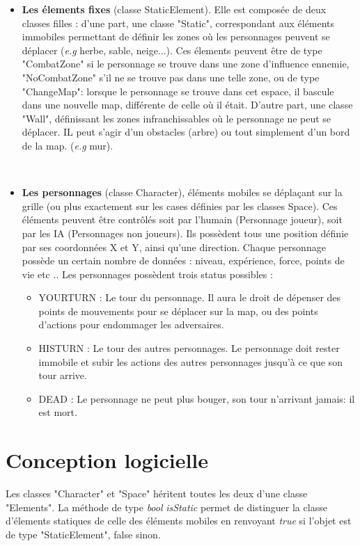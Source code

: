 \documentclass[12pt,a4paper]{report}
\begin{document}
\begin{itemize}
    

    \item  \textbf{Les élements fixes} (classe StaticElement). Elle est composée de deux classes filles : d'une part, une classe "Static", correspondant aux éléments immobiles permettant de définir les zones où les personnages peuvent se déplacer (\textit{e.g} herbe, sable, neige...). Ces élements peuvent être de type "CombatZone" si le personnage se trouve dans une zone d'influence ennemie, "NoCombatZone" s'il ne se trouve pas dans une telle zone, ou de type "ChangeMap": lorsque le personnage se trouve dans cet espace, il bascule dans une nouvelle map, différente de celle où il était.
   D'autre part, une classe "Wall", définissant les zones infranchissables où le personnage ne peut se déplacer. IL peut s'agir d'un obstacles (arbre) ou tout simplement d'un bord de la map. (\textit{e.g}  mur).
    
         
\par\leavevmode\
    \item \textbf{Les personnages} (classe Character), éléments mobiles se déplaçant sur la grille (ou plus exactement sur les cases définies par les classes Space). Ces éléments peuvent être contrôlés soit par l'humain (Personnage joueur), soit par les IA (Personnages non joueurs). Ils possèdent tous une position définie par ses coordonnées X et Y, ainsi qu'une direction. Chaque personnage possède un certain nombre de données : niveau, expérience, force, points de vie etc .. Les personnages possèdent trois status possibles :
    \begin{itemize}
    
    \item YOURTURN : Le tour du personnage. Il aura le droit de dépenser des points de mouvements pour se déplacer sur la map, ou des points d'actions pour endommager les adversaires.
    \item HISTURN : Le tour des autres personnages. Le personnage doit rester immobile et subir les actions des autres personnages jusqu'à ce que son tour arrive.
    \item  DEAD : Le personnage ne peut plus bouger, son tour n'arrivant jamais: il est mort.

    \end{itemize}
    
    \end{itemize}
    
    	\section{Conception logicielle}
	Les classes "Character" et "Space" héritent toutes les deux d'une classe "Elements". La méthode de type \textit{bool} \textit{isStatic} permet de distinguer la classe d'élements statiques de celle des éléments mobiles en renvoyant \textit{true} si l'objet est de type "StaticElement", false sinon.
    
\end{document}
